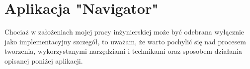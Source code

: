 \section{Aplikacja "Navigator"} \label{NavigatorAppSection}

Chociaż w założeniach mojej pracy inżynierskiej może być odebrana wyłącznie jako implementacyjny szczegół, 
to uważam, że warto pochylić się nad procesem tworzenia, wykorzystanymi narzędziami i technikami
oraz sposobem działania opisanej poniżej aplikacji.



\newpage



\newpage

